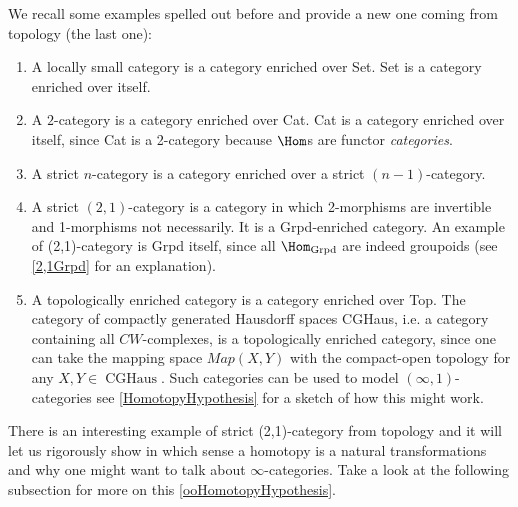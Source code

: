 \begin{ex}
    \hfill
    We recall some examples spelled out before and provide a new one coming from topology (the last one):
    \begin{enumerate}\label{Examples of enriched categories (Simplicially)}
        \item A locally small category is a category enriched over Set. Set is a category enriched over itself.
        \item A $2$-category is a category enriched over Cat. Cat is a category enriched over itself, since Cat is a 2-category because $\Hom$s are functor \emph{categories}.
        \item A strict $n$-category is a category enriched over a strict $(n-1)$-category.
        \item A strict $(2,1)$-category is a category in which 2-morphisms are invertible and 1-morphisms not necessarily. It is a Grpd-enriched category. An example of (2,1)-category is Grpd itself, since all $\Hom_{\operatorname{Grpd}}$ are indeed  groupoids (see \ref{2,1Grpd} for an explanation). 
        \item A topologically enriched category is a category enriched over Top. The category of compactly generated Hausdorff spaces CGHaus, i.e. a category containing all $CW$-complexes, is a topologically enriched category, since one can take the mapping space $Map(X,Y)$ with the compact-open topology for any $X,Y\in \operatorname{CGHaus}$. Such categories can be used to model $(\infty,1)$-categories see \ref{HomotopyHypothesis} for a sketch of how this might work.
    \end{enumerate}
\end{ex}
There is an interesting example of strict (2,1)-category from topology and it will let us rigorously show in which sense a homotopy is a natural transformations and why one might want to talk
about $\infty$-categories. Take a look at the following subsection for more on this \ref{ooHomotopyHypothesis}.

